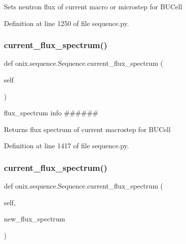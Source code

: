 \begin{DoxyVerb}Sets neutron flux of current macro or microstep
for BUCell\end{DoxyVerb}
 

Definition at line 1250 of file sequence.\+py.

\mbox{\label{classonix_1_1sequence_1_1Sequence_ad182d0b55e99defe329af078234141d6}} 
\subsubsection{\texorpdfstring{current\+\_\+flux\+\_\+spectrum()}{current\_flux\_spectrum()}\hspace{0.1cm}{\footnotesize\ttfamily [1/2]}}
{\footnotesize\ttfamily def onix.\+sequence.\+Sequence.\+current\+\_\+flux\+\_\+spectrum (\begin{DoxyParamCaption}\item[{}]{self }\end{DoxyParamCaption})}



flux\+\_\+spectrum info \#\#\#\#\#\# 

\begin{DoxyVerb}Returns flux spectrum of current macrostep
for BUCell\end{DoxyVerb}
 

Definition at line 1417 of file sequence.\+py.

\mbox{\label{classonix_1_1sequence_1_1Sequence_a9140653c7614eedb267aec10cc5b1862}} 
\subsubsection{\texorpdfstring{current\+\_\+flux\+\_\+spectrum()}{current\_flux\_spectrum()}\hspace{0.1cm}{\footnotesize\ttfamily [2/2]}}
{\footnotesize\ttfamily def onix.\+sequence.\+Sequence.\+current\+\_\+flux\+\_\+spectrum (\begin{DoxyParamCaption}\item[{}]{self,  }\item[{}]{new\+\_\+flux\+\_\+spectrum }\end{DoxyParamCaption})}

